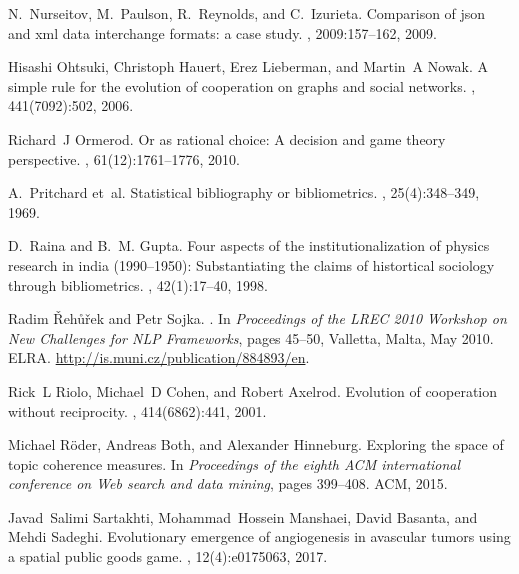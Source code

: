 \documentclass{article}
\theoremstyle{definition}
\begin{document}
\begin{thebibliography}{10}
    N.~Nurseitov, M.~Paulson, R.~Reynolds, and C.~Izurieta.
    \newblock Comparison of json and xml data interchange formats: a case study.
    , 2009:157--162, 2009.
    
    Hisashi Ohtsuki, Christoph Hauert, Erez Lieberman, and Martin~A Nowak.
    \newblock A simple rule for the evolution of cooperation on graphs and social
      networks.
    , 441(7092):502, 2006.
    
    Richard~J Ormerod.
    \newblock Or as rational choice: A decision and game theory perspective.
    , 61(12):1761--1776,
      2010.
    
    A.~Pritchard et~al.
    \newblock Statistical bibliography or bibliometrics.
    , 25(4):348--349, 1969.
    
    D.~Raina and B.~M. Gupta.
    \newblock Four aspects of the institutionalization of physics research in india
      (1990--1950): Substantiating the claims of histortical sociology through
      bibliometrics.
    , 42(1):17--40, 1998.
    
    Radim {\v R}eh{\r u}{\v r}ek and Petr Sojka.
    .
    \newblock In {\em {Proceedings of the LREC 2010 Workshop on New Challenges for
      NLP Frameworks}}, pages 45--50, Valletta, Malta, May 2010. ELRA.
    \newblock \url{http://is.muni.cz/publication/884893/en}.
    
    Rick~L Riolo, Michael~D Cohen, and Robert Axelrod.
    \newblock Evolution of cooperation without reciprocity.
    , 414(6862):441, 2001.
    
    Michael R{\"o}der, Andreas Both, and Alexander Hinneburg.
    \newblock Exploring the space of topic coherence measures.
    \newblock In {\em Proceedings of the eighth ACM international conference on Web
      search and data mining}, pages 399--408. ACM, 2015.
    
    Javad~Salimi Sartakhti, Mohammad~Hossein Manshaei, David Basanta, and Mehdi
      Sadeghi.
    \newblock Evolutionary emergence of angiogenesis in avascular tumors using a
      spatial public goods game.
    , 12(4):e0175063, 2017.
    

\end{thebibliography}
\end{document}
